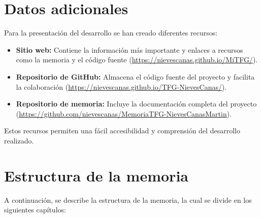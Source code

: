 \documentclass[a4paper, 12pt]{book}
\begin{document}
\section{Datos adicionales}
Para la presentación del desarrollo se han creado diferentes recursos:

\begin{itemize}
    \item \textbf{Sitio web:} Contiene la información más importante y enlaces a recursos como la memoria y el código fuente (\url{https://nievescanas.github.io/MiTFG/}).
    \item \textbf{Repositorio de GitHub:} Almacena el código fuente del proyecto y facilita la colaboración (\url{https://nievescanas.github.io/TFG-NievesCanas/}).
    \item \textbf{Repositorio de memoria:} Incluye la documentación completa del proyecto (\url{https://github.com/nievescanas/MemoriaTFG-NievesCanasMartin}).
\end{itemize}

Estos recursos permiten una fácil accesibilidad y comprensión del desarrollo realizado.

\newpage
\section{Estructura de la memoria}

A continuación, se describe la estructura de la memoria, la cual se divide en los siguientes capítulos:
\end{document}
